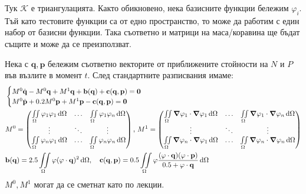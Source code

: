 \documentclass[bulgarian, 12pt]{article}
\begin{document}
\begin{large}
Тук $\mathcal{K}$ е триангулацията. 
Както обикновено, нека базисните функции бележим $\varphi_i$. 
Тъй като тестовите функции са от едно пространство, то може да работим с един набор от базисни функции.
Така съответно и матрици на маса/коравина ще бъдат същите и може да се преизползват.

Нека с $\mathbf{q}, \mathbf{p}$ бележим съответно векторите от приближените стойности на $N$ и $P$ във възлите в момент $t$.
След стандартните разписвания имаме: 
\begin{align*}
  &\begin{cases}
	  M^0\dot{\mathbf{q}} - M^0\mathbf{q} + M^1\mathbf{q} + \mathbf{b}(\mathbf{q}) + \mathbf{c}(\mathbf{q},\mathbf{p}) = \mathbf{0} \\
    M^0\dot{\mathbf{p}} + 0.2 M^0\mathbf{p} + M^1\mathbf{p} - \mathbf{c}(\mathbf{q},\mathbf{p}) = \mathbf{0} \\
	\end{cases} \\
  &M^0=\begin{pmatrix}
	\iint\limits_{\Omega} \varphi_1 \varphi_1 \,\dd\Omega & \hdots & \iint\limits_{\Omega} \varphi_1 \varphi_n \,\dd\Omega \\
	\vdots & \ddots & \vdots \\
	\iint\limits_{\Omega} \varphi_n \varphi_1 \,\dd\Omega & \hdots & \iint\limits_{\Omega} \varphi_n \varphi_n \,\dd\Omega \\
	\end{pmatrix},\,
  M^1=\begin{pmatrix}
	\iint\limits_{\Omega} \grad \varphi_1 \cdot \grad \varphi_1 \,\dd\Omega & \hdots & \iint\limits_{\Omega} \grad \varphi_1 \cdot \grad \varphi_n \,\dd\Omega \\
	\vdots & \ddots & \vdots \\
	\iint\limits_{\Omega} \grad \varphi_n \cdot \grad \varphi_1 \,\dd\Omega & \hdots & \iint\limits_{\Omega} \grad \varphi_n \cdot \grad \varphi_n \,\dd\Omega \\
	\end{pmatrix}\\
  &\mathbf{b}(\mathbf{q}) = 2.5 \iint\limits_{\Omega} \mathbf{\varphi} (\mathbf{\varphi} \cdot \mathbf{q})^2\,\dd\Omega ,\quad
  \mathbf{c}(\mathbf{q},\mathbf{p}) = 0.5 \iint\limits_{\Omega} \mathbf{\varphi} \frac{(\mathbf{\varphi} \cdot \mathbf{q})(\mathbf{\varphi} \cdot \mathbf{p})}{0.5 + \mathbf{\varphi} \cdot \mathbf{q}} \,\dd\Omega
\end{align*}
$M^0, M^1$ могат да се сметнат като по лекции. 


\end{large}
\end{document}
